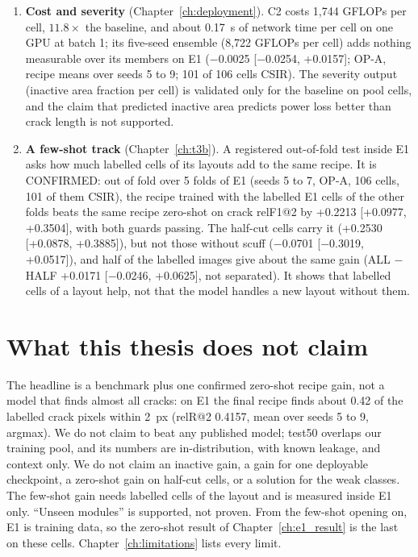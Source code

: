 \begin{enumerate}
  lower end is near 0 and the smallest detectable effect of the read is about 0.074. Most of the gain is the model (+0.0451
  [+0.0173, +0.0699] with the same eight views on both sides); the D4 part is not resolved on E1. C2's readout and views were
  chosen on pool cells, and E1 had seven earlier registered openings for other models.
  \item \textbf{Cost and severity} (Chapter~\ref{ch:deployment}). C2 costs 1,744 GFLOPs per cell, $11.8\times$ the baseline, and
  about 0.17~s of network time per cell on one GPU at batch 1; its five-seed ensemble (8,722 GFLOPs per cell) adds nothing
  measurable over its members on E1 ($-$0.0025 [$-$0.0254, +0.0157]; OP-A, recipe means over seeds 5 to 9; 101 of 106 cells
  CSIR). The severity output (inactive area fraction per cell) is validated
  only for the baseline on pool cells, and the claim that predicted inactive area predicts power loss better than crack length is
  not supported.
  \item \textbf{A few-shot track} (Chapter~\ref{ch:t3b}). A registered out-of-fold test inside E1 asks how much labelled cells of
  its layouts add to the same recipe. It is CONFIRMED: out of fold over 5 folds of E1 (seeds 5 to 7, OP-A, 106 cells, 101 of them
  CSIR), the recipe trained with the labelled E1 cells of the other folds beats the same recipe zero-shot on crack relF1@2 by
  +0.2213 [+0.0977, +0.3504], with both guards passing. The half-cut cells carry it (+0.2530 [+0.0878, +0.3885]), but not those
  without scuff ($-$0.0701 [$-$0.3019, +0.0517]), and half of the labelled images give about the same gain (ALL $-$ HALF +0.0171
  [$-$0.0246, +0.0625], not separated). It shows that labelled cells of a layout help, not that the model handles a new layout
  without them.
\end{enumerate}

\section{What this thesis does not claim}\label{sec:intro-not}

The headline is a benchmark plus one confirmed zero-shot recipe gain, not a model that finds almost all cracks: on E1 the final recipe
finds about 0.42 of the labelled crack pixels within 2~px (relR@2 0.4157, mean over seeds 5 to 9, argmax). We do not claim to beat
any published model; test50 overlaps our training pool, and its numbers are in-distribution, with known leakage, and context
only. We do not claim an inactive gain, a gain for one deployable checkpoint, a zero-shot gain on half-cut cells, or a solution for
the weak classes. The few-shot gain needs labelled cells of the layout and is measured inside E1 only. ``Unseen modules'' is
supported, not proven. From the few-shot opening on, E1 is training data, so the zero-shot
result of Chapter~\ref{ch:e1_result} is the last on these cells. Chapter~\ref{ch:limitations} lists every limit.

